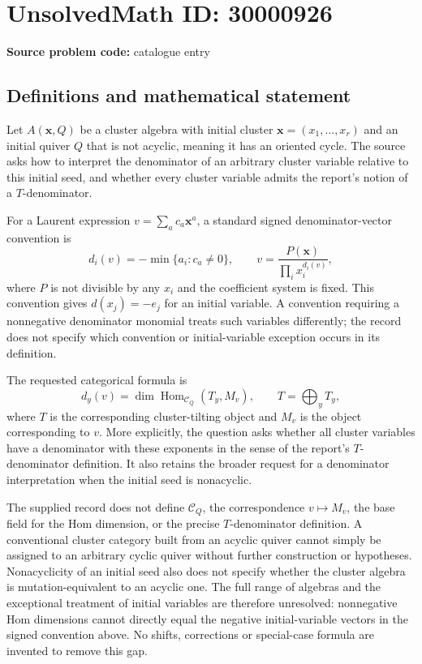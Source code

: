 \documentclass[11pt]{article}
\begin{document}
\section*{UnsolvedMath ID: 30000926}
\textbf{Source problem code:} catalogue entry
\subsection{Definitions and mathematical statement}
Let $A(\mathbf x,Q)$ be a cluster algebra with initial cluster $\mathbf x=(x_1,\ldots,x_r)$ and an initial quiver $Q$ that is not acyclic, meaning it has an oriented cycle. The source asks how to interpret the denominator of an arbitrary cluster variable relative to this initial seed, and whether every cluster variable admits the report's notion of a $T$-denominator.

For a Laurent expression $v=\sum_a c_a\mathbf x^a$, a standard signed denominator-vector convention is
\[
d_i(v)=-\min\{a_i:c_a\ne0\},\qquad
v=\frac{P(\mathbf x)}{\prod_i x_i^{d_i(v)}},
\]
where $P$ is not divisible by any $x_i$ and the coefficient system is fixed. This convention gives $d(x_j)=-e_j$ for an initial variable. A convention requiring a nonnegative denominator monomial treats such variables differently; the record does not specify which convention or initial-variable exception occurs in its definition.

The requested categorical formula is
\[
d_y(v)=\dim\operatorname{Hom}_{\mathcal C_Q}(T_y,M_v),
\qquad T=\bigoplus_yT_y,
\]
where $T$ is the corresponding cluster-tilting object and $M_v$ is the object corresponding to $v$. More explicitly, the question asks whether all cluster variables have a denominator with these exponents in the sense of the report's $T$-denominator definition. It also retains the broader request for a denominator interpretation when the initial seed is nonacyclic.

The supplied record does not define $\mathcal C_Q$, the correspondence $v\mapsto M_v$, the base field for the Hom dimension, or the precise $T$-denominator definition. A conventional cluster category built from an acyclic quiver cannot simply be assigned to an arbitrary cyclic quiver without further construction or hypotheses. Nonacyclicity of an initial seed also does not specify whether the cluster algebra is mutation-equivalent to an acyclic one. The full range of algebras and the exceptional treatment of initial variables are therefore unresolved: nonnegative Hom dimensions cannot directly equal the negative initial-variable vectors in the signed convention above. No shifts, corrections or special-case formula are invented to remove this gap.
\end{document}
